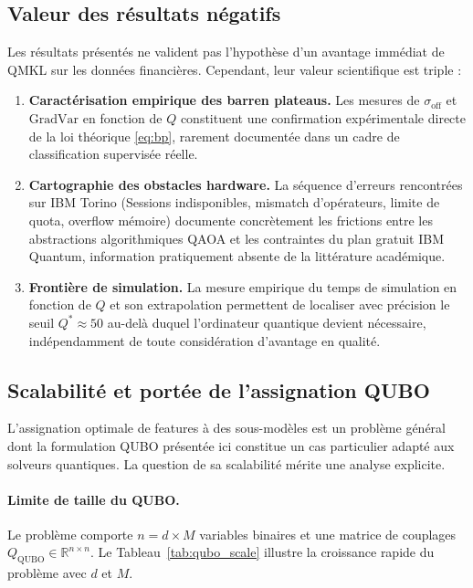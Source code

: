 \documentclass[12pt,a4paper]{article}
\begin{document}
\subsection{Valeur des résultats négatifs}

Les résultats présentés ne valident pas l'hypothèse d'un avantage immédiat
de QMKL sur les données financières.
Cependant, leur valeur scientifique est triple :

\begin{enumerate}[label=(\roman*)]
  \item \textbf{Caractérisation empirique des barren plateaus.}
  Les mesures de $\sigma_{\mathrm{off}}$ et $\mathrm{GradVar}$ en fonction
  de $Q$ constituent une confirmation expérimentale directe de la loi
  théorique \eqref{eq:bp}, rarement documentée dans un cadre de
  classification supervisée réelle.

  \item \textbf{Cartographie des obstacles hardware.}
  La séquence d'erreurs rencontrées sur IBM Torino (Sessions indisponibles,
  mismatch d'opérateurs, limite de quota, overflow mémoire) documente
  concrètement les frictions entre les abstractions algorithmiques QAOA
  et les contraintes du plan gratuit IBM Quantum, information pratiquement
  absente de la littérature académique.

  \item \textbf{Frontière de simulation.}
  La mesure empirique du temps de simulation en fonction de $Q$ et son
  extrapolation permettent de localiser avec précision le seuil
  $Q^* \approx 50$ au-delà duquel l'ordinateur quantique devient
  nécessaire, indépendamment de toute considération d'avantage en qualité.
\end{enumerate}

\subsection{Scalabilité et portée de l'assignation QUBO}
\label{sec:scalability}

L'assignation optimale de features à des sous-modèles est un problème général
dont la formulation QUBO présentée ici constitue un cas particulier adapté aux
solveurs quantiques.
La question de sa scalabilité mérite une analyse explicite.

\paragraph{Limite de taille du QUBO.}
Le problème comporte $n = d \times M$ variables binaires et une matrice de
couplages $Q_{\mathrm{QUBO}} \in \mathbb{R}^{n \times n}$.
Le Tableau~\ref{tab:qubo_scale} illustre la croissance rapide du problème avec
$d$ et $M$.
\end{document}
